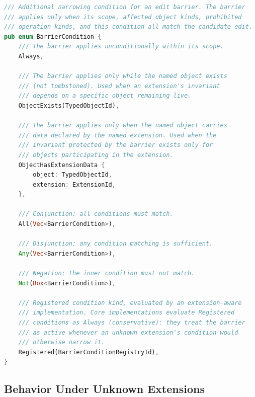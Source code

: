 \documentclass[11pt,letterpaper]{report}
\begin{document}
\begin{lstlisting}[language=Rust]
/// Additional narrowing condition for an edit barrier. The barrier
/// applies only when its scope, affected object kinds, prohibited
/// operation kinds, and this condition all match the candidate edit.
pub enum BarrierCondition {
    /// The barrier applies unconditionally within its scope.
    Always,

    /// The barrier applies only while the named object exists
    /// (not tombstoned). Used when an extension's invariant
    /// depends on a specific object remaining live.
    ObjectExists(TypedObjectId),

    /// The barrier applies only when the named object carries
    /// data declared by the named extension. Used when the
    /// invariant protected by the barrier exists only for
    /// objects participating in the extension.
    ObjectHasExtensionData {
        object: TypedObjectId,
        extension: ExtensionId,
    },

    /// Conjunction: all conditions must match.
    All(Vec<BarrierCondition>),

    /// Disjunction: any condition matching is sufficient.
    Any(Vec<BarrierCondition>),

    /// Negation: the inner condition must not match.
    Not(Box<BarrierCondition>),

    /// Registered condition kind, evaluated by an extension-aware
    /// implementation. Core implementations evaluate Registered
    /// conditions as Always (conservative): they treat the barrier
    /// as active whenever an unknown extension's condition would
    /// otherwise narrow it.
    Registered(BarrierConditionRegistryId),
}
\end{lstlisting}

\subsection{Behavior Under Unknown Extensions}
\end{document}
